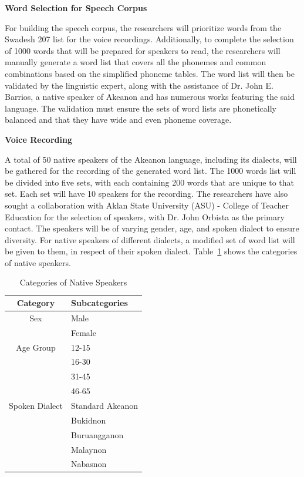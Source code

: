 \textbf{Word Selection for Speech Corpus}

For building the speech corpus, the researchers will prioritize words from the Swadesh 207 list for the voice recordings. Additionally, to complete the selection of 1000 words that will be prepared for speakers to read, the researchers will manually generate a word list that covers all the phonemes and common combinations based on the simplified phoneme tables. The word list will then be validated by the linguistic expert, along with the assistance of Dr. John E. Barrios, a native speaker of Akeanon and has numerous works featuring the said language. The validation must ensure the sets of word lists are phonetically balanced and that they have wide and even phoneme coverage.

\textbf{Voice Recording}

A total of 50 native speakers of the Akeanon language, including its dialects, will be gathered for the recording of the generated word list. The 1000 words list will be divided into five sets, with each containing 200 words that are unique to that set. Each set will have 10 speakers for the recording. The researchers have also sought a collaboration with Aklan State University (ASU) - College of Teacher Education for the selection of speakers, with Dr. John Orbista as the primary contact. The speakers will be of varying gender, age, and spoken dialect to ensure diversity. For native speakers of different dialects, a modified set of word list will be given to them, in respect of their spoken dialect. Table~\ref{tab:native_speakers} shows the categories of native speakers. 

\begin{table}[H]
   \centering
   \caption{Categories of Native Speakers} \vspace{0.25em}
   \label{tab:native_speakers}
   \renewcommand{\arraystretch}{1.5} %
   \setlength{\tabcolsep}{10pt} %

\begin{tabular}{|c|p{2in}|} \hline
   \centering Category & Subcategories \\ \hline
   Sex & Male \\ 
   & Female \\ 
   \hline
   Age Group & 
   12-15 \\ 
   & 16-30 \\ 
   & 31-45 \\ 
   & 46-65 \\ \hline
   Spoken Dialect & 
   Standard Akeanon \\ 
   & Bukidnon \\ 
   & Buruangganon \\ 
   & Malaynon \\ 
   & Nabasnon \\ \hline
\end{tabular}
\end{table}

